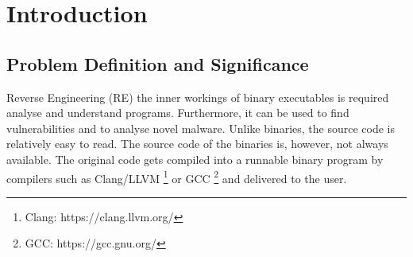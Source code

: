 \chapter{Introduction}
\label{introduction}




\section{Problem Definition and Significance}
Reverse Engineering (RE) the inner workings of binary executables is required analyse and understand programs. Furthermore, it can be used to find vulnerabilities and to analyse novel malware. Unlike binaries, the source code is relatively easy to read. The source code of the binaries is, however, not always available. The original code gets compiled into a runnable binary program by compilers such as Clang/LLVM \footnote{Clang: https://clang.llvm.org/} or GCC \footnote{GCC: https://gcc.gnu.org/} and delivered to the user.

